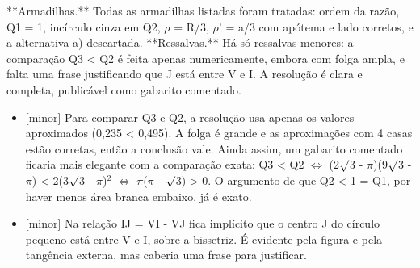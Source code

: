 \documentclass{article}%
\begin{document}
**Armadilhas.** Todas as armadilhas listadas foram tratadas: ordem da razão, Q1 = 1, incírculo cinza em Q2, $\rho$ = R/3, $\rho$' = a/3 com apótema e lado corretos, e a alternativa a) descartada.\newline%
\newline%
**Ressalvas.** Há só ressalvas menores: a comparação Q3 < Q2 é feita apenas numericamente, embora com folga ampla, e falta uma frase justificando que J está entre V e I.\newline%
\newline%
A resolução é clara e completa, publicável como gabarito comentado.%
\begin{itemize}%
\item%
{[}minor{]} Para comparar Q3 e Q2, a resolução usa apenas os valores aproximados (0,235 < 0,495). A folga é grande e as aproximações com 4 casas estão corretas, então a conclusão vale. Ainda assim, um gabarito comentado ficaria mais elegante com a comparação exata: Q3 < Q2 $\Leftrightarrow$ (2$\surd$3 - $\pi$)(9$\surd$3 - $\pi$) < 2(3$\surd$3 - $\pi$)$^2$ $\Leftrightarrow$ $\pi$($\pi$ - $\surd$3) > 0. O argumento de que Q2 < 1 = Q1, por haver menos área branca embaixo, já é exato.%
\item%
{[}minor{]} Na relação IJ = VI - VJ fica implícito que o centro J do círculo pequeno está entre V e I, sobre a bissetriz. É evidente pela figura e pela tangência externa, mas caberia uma frase para justificar.%
\end{itemize}%
\end{document}
